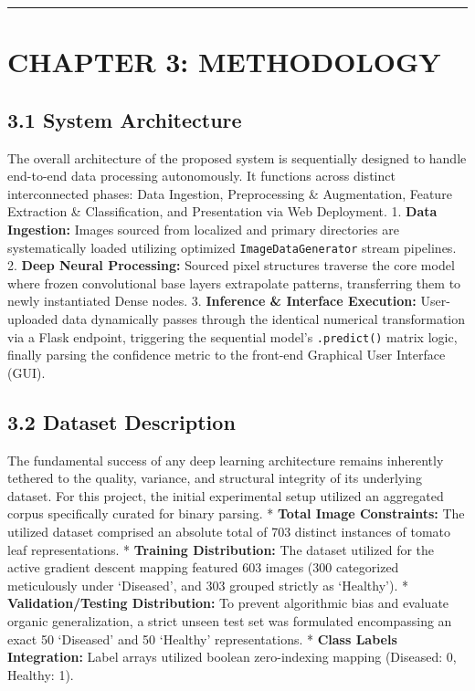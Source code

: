 \documentclass[
]{article}
\begin{document}
\begin{center}\rule{0.5\linewidth}{0.5pt}\end{center}

\section{CHAPTER 3: METHODOLOGY}\label{chapter-3-methodology}

\subsection{3.1 System Architecture}\label{system-architecture}

The overall architecture of the proposed system is sequentially designed
to handle end-to-end data processing autonomously. It functions across
distinct interconnected phases: Data Ingestion, Preprocessing \&
Augmentation, Feature Extraction \& Classification, and Presentation via
Web Deployment. 1. \textbf{Data Ingestion:} Images sourced from
localized and primary directories are systematically loaded utilizing
optimized \texttt{ImageDataGenerator} stream pipelines. 2. \textbf{Deep
Neural Processing:} Sourced pixel structures traverse the core model
where frozen convolutional base layers extrapolate patterns,
transferring them to newly instantiated Dense nodes. 3.
\textbf{Inference \& Interface Execution:} User-uploaded data
dynamically passes through the identical numerical transformation via a
Flask endpoint, triggering the sequential model's \texttt{.predict()}
matrix logic, finally parsing the confidence metric to the front-end
Graphical User Interface (GUI).

\subsection{3.2 Dataset Description}\label{dataset-description}

The fundamental success of any deep learning architecture remains
inherently tethered to the quality, variance, and structural integrity
of its underlying dataset. For this project, the initial experimental
setup utilized an aggregated corpus specifically curated for binary
parsing. * \textbf{Total Image Constraints:} The utilized dataset
comprised an absolute total of 703 distinct instances of tomato leaf
representations. * \textbf{Training Distribution:} The dataset utilized
for the active gradient descent mapping featured 603 images (300
categorized meticulously under `Diseased', and 303 grouped strictly as
`Healthy'). * \textbf{Validation/Testing Distribution:} To prevent
algorithmic bias and evaluate organic generalization, a strict unseen
test set was formulated encompassing an exact 50 `Diseased' and 50
`Healthy' representations. * \textbf{Class Labels Integration:} Label
arrays utilized boolean zero-indexing mapping (Diseased: 0, Healthy: 1).
\end{document}
